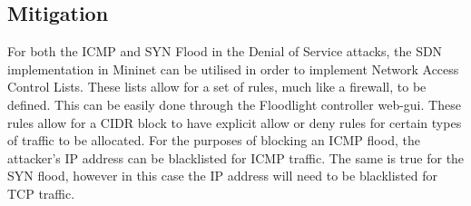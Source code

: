 \subsection{Mitigation}

For both the ICMP and SYN Flood in the Denial of Service attacks, the SDN
implementation in Mininet can be utilised in order to implement Network Access
Control Lists. These lists allow for a set of rules, much like a firewall, to be
defined. This can be easily done through the Floodlight controller web-gui.
These rules allow for a CIDR block to have explicit allow or deny rules for
certain types of traffic to be allocated. For the purposes of blocking an ICMP
flood, the attacker's IP address can be blacklisted for ICMP traffic. The same
is true for the SYN flood, however in this case the IP address will need to be
blacklisted for TCP traffic.
